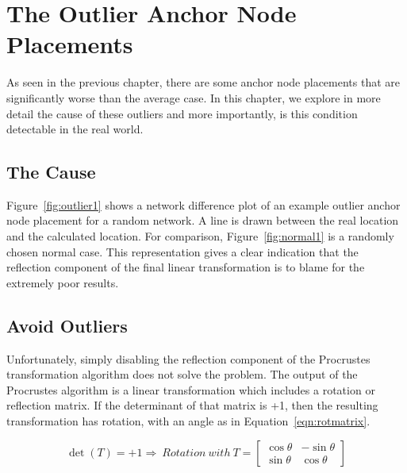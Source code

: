 \chapter{The Outlier Anchor Node Placements}
\label{chap:outliers}
As seen in the previous chapter, there are some anchor node placements that are significantly worse than the average case.   In this chapter, we explore in more detail the cause of these outliers and more importantly, is this condition detectable in the real world.

\section{The Cause}
Figure~\ref{fig:outlier1} shows a network difference plot of an example outlier anchor node placement for a random network. A line is drawn between the real location and the calculated location.  For comparison, Figure~\ref{fig:normal1} is a randomly chosen normal case. This representation gives a clear indication that the reflection component of the final linear transformation is to blame for the extremely poor results.  

\begin{figure}
  \centering
	\label{fig:outliernetworkdiff}
	\caption{}
\end{figure}

\section{Avoid Outliers}

Unfortunately, simply disabling the reflection component of the Procrustes transformation algorithm does not solve the problem.  The output of the Procrustes algorithm is a linear transformation which includes a rotation or reflection matrix.  If the determinant of that matrix is +1, then the resulting transformation has rotation, with an angle as in Equation~\ref{eqn:rotmatrix}.  

\begin{equation}
	\det{(T)}=+1 \Rightarrow ~Rotation ~with ~T=
	\begin{bmatrix}
	\cos{\theta} & -\sin{\theta} \\ 
	\sin{\theta} & \cos{\theta}\end{bmatrix}
	\label{eqn:rotmatrix} 
\end{equation}

